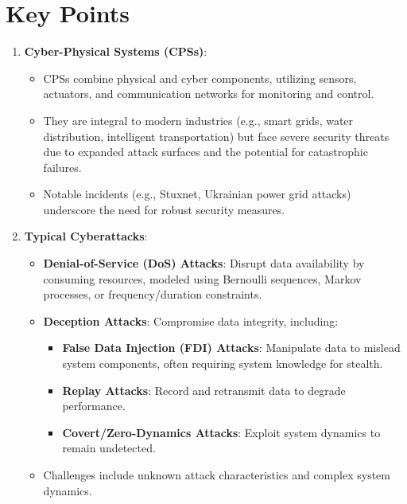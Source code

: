 \documentclass{article}
\begin{document}
\section*{Key Points}
\begin{enumerate}[leftmargin=*]
    \item \textbf{Cyber-Physical Systems (CPSs)}:
    \begin{itemize}
        \item CPSs combine physical and cyber components, utilizing sensors, actuators, and communication networks for monitoring and control.
        \item They are integral to modern industries (e.g., smart grids, water distribution, intelligent transportation) but face severe security threats due to expanded attack surfaces and the potential for catastrophic failures.
        \item Notable incidents (e.g., Stuxnet, Ukrainian power grid attacks) underscore the need for robust security measures.
    \end{itemize}
    
    \item \textbf{Typical Cyberattacks}:
    \begin{itemize}
        \item \textbf{Denial-of-Service (DoS) Attacks}: Disrupt data availability by consuming resources, modeled using Bernoulli sequences, Markov processes, or frequency/duration constraints.
        \item \textbf{Deception Attacks}: Compromise data integrity, including:
        \begin{itemize}
            \item \textbf{False Data Injection (FDI) Attacks}: Manipulate data to mislead system components, often requiring system knowledge for stealth.
            \item \textbf{Replay Attacks}: Record and retransmit data to degrade performance.
            \item \textbf{Covert/Zero-Dynamics Attacks}: Exploit system dynamics to remain undetected.
        \end{itemize}
        \item Challenges include unknown attack characteristics and complex system dynamics.
    \end{itemize}
    

\end{enumerate}
\end{document}
